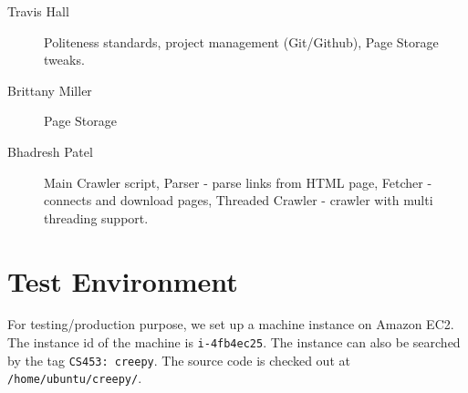 \documentclass[letterpaper,11pt,twoside]{article}
\begin{document}
\begin{description}
 \item[Travis Hall] Politeness standards, project management (Git/Github), Page Storage tweaks.
 \item[Brittany Miller] Page Storage
 \item[Bhadresh Patel] Main Crawler script, Parser - parse links from HTML page, Fetcher - connects and download pages, Threaded Crawler - crawler with multi threading support.
\end{description}

\section{Test Environment}
For testing/production purpose, we set up a machine instance on Amazon EC2. The instance id of the machine is \texttt{i-4fb4ec25}. The instance can also be searched by the tag \texttt{CS453: creepy}. The source code is checked out at \texttt{/home/ubuntu/creepy/}.
\end{document}
